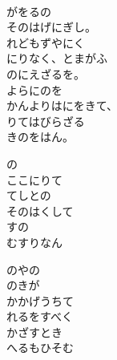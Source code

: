 \documentclass[10pt,b5j]{tarticle} %
\begin{document}
\vspace{1.5em} %
\newcommand{\linespace}{0.5em} %
\newcommand{\blocksize}{0.5\hsize} %
\begin{enumerate} %
    \begin{minipage}[c]{\blocksize}
    
        \vspace{\linespace}
        \item
         \\
        がをるの\\
        そのはげにぎし。\\
        れどもずやにく\\
        にりなく、とまがふ\\
        のにえざるを。\\
        よらにのを\\
        かんよりはにをきて、\\
        りてはびらざる\\
        きのをはん。
        
        \vspace{\linespace}
        \item
        の\\
        ここにりて\\
        てしとの\\
        そのはくして\\
        すの\\
        むすりなん
        
        \vspace{\linespace}
        \item
        のやの\\
        のきが\\
        かかげうちて\\
        れるをすべく\\
        かざすとき\\
        へるもひそむ
        

\end{minipage}
\end{enumerate}
\end{document}
